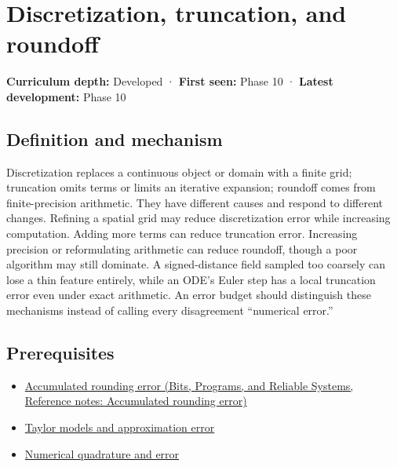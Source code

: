 \hypertarget{appendix-6b0648b2b8e8}{}\label{referencestart:appendix-6b0648b2b8e8}
\section{Discretization, truncation, and roundoff}\label{appendix-6b0648b2b8e8-discretization-truncation-and-roundoff}

\hypertarget{appendix-6b0648b2b8e8-discretization-truncation-and-roundoff}{}

\textbf{Curriculum depth:} Developed · \textbf{First seen:} Phase 10 · \textbf{Latest development:} Phase 10

\begin{allmightroledefinition}

\subsection{Definition and mechanism}\label{appendix-6b0648b2b8e8-definition-and-mechanism}

\hypertarget{appendix-6b0648b2b8e8-definition-and-mechanism}{}

Discretization replaces a continuous object or domain with a finite grid; truncation omits terms or limits an iterative expansion; roundoff comes from finite-precision arithmetic. They have different causes and respond to different changes. Refining a spatial grid may reduce discretization error while increasing computation. Adding more terms can reduce truncation error. Increasing precision or reformulating arithmetic can reduce roundoff, though a poor algorithm may still dominate. A signed-distance field sampled too coarsely can lose a thin feature entirely, while an ODE's Euler step has a local truncation error even under exact arithmetic. An error budget should distinguish these mechanisms instead of calling every disagreement ``numerical error.''

\end{allmightroledefinition}

\subsection{Prerequisites}\label{appendix-6b0648b2b8e8-prerequisites}

\hypertarget{appendix-6b0648b2b8e8-prerequisites}{}

\begin{itemize}
\tightlist
\item
  \href{../01-Bits-Programs-and-Reliable-Systems/main.pdf\#nameddest=appendix-f82e270791c8}{Accumulated rounding error (Bits, Programs, and Reliable Systems, Reference notes: Accumulated rounding error)}
\item
  \hyperref[appendix-32f39e9a3738]{Taylor models and approximation error}
\item
  \hyperref[appendix-80521eae6b71]{Numerical quadrature and error}
\end{itemize}

